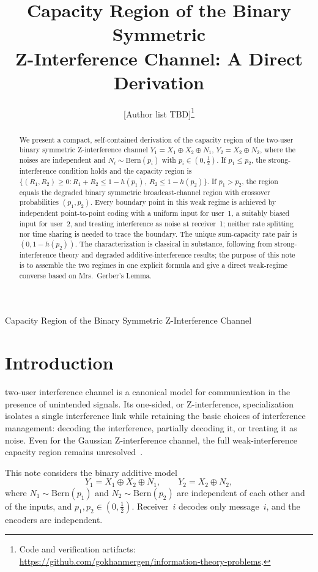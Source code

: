 \documentclass[12pt,draftclsnofoot,onecolumn,conference]{IEEEtran}
\title{Capacity Region of the Binary Symmetric\\
Z-Interference Channel: A Direct Derivation}
\author{%
  [Author list TBD]\thanks{%
  Code and verification artifacts:
  \url{https://github.com/gokhanmergen/information-theory-problems}.}}
\begin{document}
%
{Capacity Region of the Binary Symmetric Z-Interference Channel}

\maketitle

\begin{abstract}
We present a compact, self-contained derivation of the capacity region of the
two-user binary symmetric Z-interference channel
$Y_1=X_1\oplus X_2\oplus N_1$, $Y_2=X_2\oplus N_2$, where the noises are
independent and $N_i\sim\mathrm{Bern}(p_i)$ with
$p_i\in(0,\tfrac12)$. If $p_1\le p_2$, the strong-interference condition
holds and the capacity region is
$\{(R_1,R_2)\ge0:R_1+R_2\le1-h(p_1),\ R_2\le1-h(p_2)\}$. If $p_1>p_2$,
the region equals the degraded binary symmetric broadcast-channel region
with crossover probabilities $(p_1,p_2)$. Every boundary point in this weak
regime is achieved by independent point-to-point coding with a uniform input
for user~1, a suitably biased input for user~2, and treating interference as
noise at receiver~1; neither rate splitting nor time sharing is needed to
trace the boundary. The unique sum-capacity rate pair is
$(0,1-h(p_2))$. The characterization is classical in substance, following
from strong-interference theory and degraded additive-interference results;
the purpose of this note is to assemble the two regimes in one explicit
formula and give a direct weak-regime converse based on Mrs.~Gerber's Lemma.
\end{abstract}

\IEEEpeerreviewmaketitle

\section{Introduction}

 two-user interference channel is a canonical model for
communication in the presence of unintended signals. Its one-sided, or
Z-interference, specialization isolates a single interference link while
retaining the basic choices of interference management: decoding the
interference, partially decoding it, or treating it as noise. Even for the
Gaussian Z-interference channel, the full weak-interference capacity region
remains unresolved~\cite{Costa85,CNN24,GNZ24}.

This note considers the binary additive model
\begin{equation}\label{eq:model}
Y_1=X_1\oplus X_2\oplus N_1,\qquad Y_2=X_2\oplus N_2,
\end{equation}
where $N_1\sim\mathrm{Bern}(p_1)$ and
$N_2\sim\mathrm{Bern}(p_2)$ are independent of each other and of the inputs,
and $p_1,p_2\in(0,\tfrac12)$. Receiver~$i$ decodes only message~$i$, and the
encoders are independent.
\end{document}
